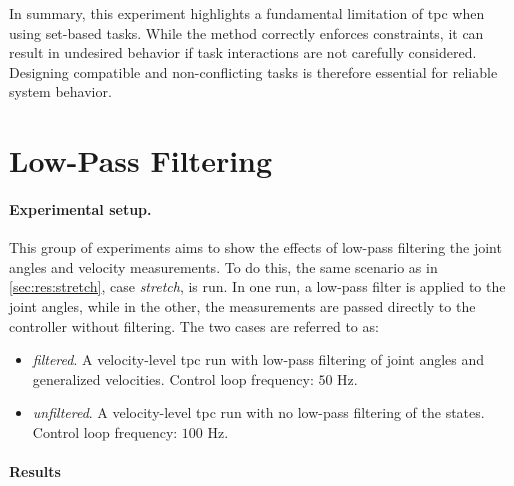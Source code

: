 In summary, this experiment highlights a fundamental limitation of \gls{tpc} when using set-based tasks. While the method correctly enforces constraints, it can result in undesired behavior if task interactions are not carefully considered. Designing compatible and non-conflicting tasks is therefore essential for reliable system behavior.

\FloatBarrier


\newpage
\section{Low-Pass Filtering}
\label{sec:results:lowpass_filtering}
\label{sec:results:lowpass}

\paragraph{Experimental setup.}
This group of experiments aims to show the effects of low-pass filtering the
joint angles and velocity measurements. To do this, the same scenario as in \autoref{sec:res:stretch}, case \textit{stretch},
is run. 
In one run, a low-pass filter is applied to the joint angles, while in the other, the measurements are passed directly to the controller without filtering.
The two cases are referred to as:
\begin{itemize}
    \item \textit{filtered}. A velocity-level \gls{tpc} run with low-pass filtering of joint angles and generalized velocities.
        Control loop frequency: \(50\) Hz.
    \item \textit{unfiltered}. A velocity-level \gls{tpc} run with no low-pass filtering of the states.
        Control loop frequency: \(100\) Hz.
\end{itemize}

\paragraph{Results}

